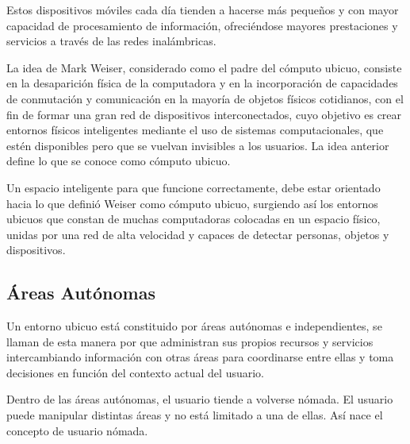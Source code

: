 \vspace{0.2cm}

Estos dispositivos móviles cada día tienden a hacerse más pequeños
y con mayor capacidad de procesamiento de información,
ofreciéndose mayores prestaciones y servicios a través de las
redes inalámbricas.\\

\vspace{0.2cm}

La idea de Mark Weiser, considerado como el padre del cómputo
ubicuo, consiste en la desaparición física de la computadora y en
la incorporación de capacidades de conmutación y comunicación en
la mayoría de objetos físicos cotidianos, con el fin de formar una
gran red de dispositivos interconectados, cuyo objetivo es crear
entornos físicos inteligentes mediante el uso de sistemas
computacionales, que estén disponibles pero que se vuelvan
invisibles a los usuarios\cite{Castro2010}. La idea anterior
define lo que se
conoce como cómputo ubicuo.\\

\vspace{0.2cm}

Un espacio inteligente para que funcione correctamente, debe estar
orientado hacia lo que definió Weiser como cómputo ubicuo,
surgiendo así los entornos ubicuos que constan de muchas
computadoras colocadas en un espacio físico, unidas por una red de
alta velocidad y capaces de detectar personas, objetos y
dispositivos.\\

\vspace{0.2cm}

\subsection{Áreas Autónomas}

Un entorno ubicuo está constituido por áreas autónomas e
independientes, se llaman de esta manera por que administran sus
propios recursos y servicios intercambiando información con otras
áreas para coordinarse entre ellas y toma decisiones en función
del contexto actual del usuario\cite{Tanenbaum1996}.\\

\vspace{0.2cm}

Dentro de las áreas autónomas, el usuario tiende a volverse
nómada. El usuario puede manipular distintas áreas y no está
limitado a una de ellas. Así nace el concepto de usuario nómada.\\

